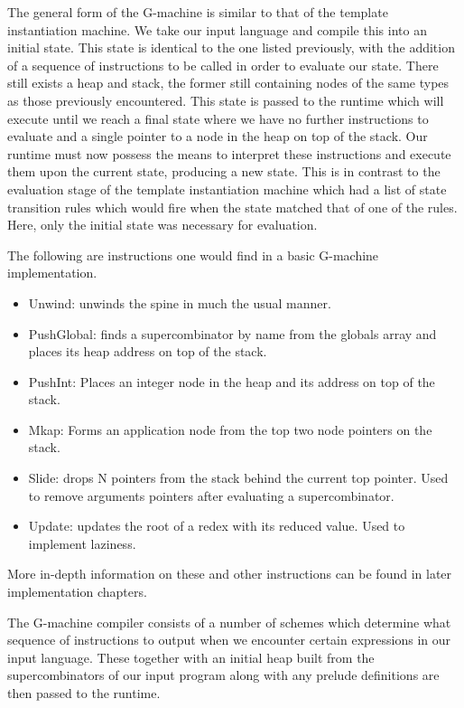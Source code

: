 \documentclass[11pt]{article}
\begin{document}
The general form of the G-machine is similar to that of
the template instantiation machine. We take our input language
and compile this into an initial state. This state is identical
to the one listed previously, with the addition of a sequence
of instructions to be called in order to evaluate our state.
There still exists a heap and stack, the former still containing
nodes of the same types as those previously encountered.
This state is passed to the runtime which will execute until
we reach a final state where we have no further instructions
to evaluate and a single pointer to a node in the heap on top
of the stack. Our runtime must now possess the means to 
interpret these instructions and execute them upon the current
state, producing a new state. This is in contrast to the 
evaluation stage of the template instantiation machine which
had a list of state transition rules which would fire when
the state matched that of one of the rules. Here, only the
initial state was necessary for evaluation.

The following are instructions one would find in a
basic G-machine implementation. 

\begin{itemize}
	\item Unwind: unwinds the spine in much the usual
		  manner.
	\item PushGlobal: finds a supercombinator by name 
		  from the globals array and places its heap
		  address on top of the stack.
	\item PushInt: Places an integer node in the heap
		  and its address on top of the stack.
	\item Mkap: Forms an application node from the
		  top two node pointers on the stack.
	\item Slide: drops N pointers from the stack behind
		  the current top pointer. Used to remove
		  arguments pointers after evaluating a 
		  supercombinator.
	\item Update: updates the root of a redex with its
		  reduced value. Used to implement laziness.
\end{itemize}

\noindent More in-depth information on these and other 
instructions can be found in later implementation chapters. 

The G-machine compiler consists of a number of schemes which
determine what sequence of instructions to output when we
encounter certain expressions in our input language. These
together with an initial heap built from the supercombinators
of our input program along with any prelude definitions are
then passed to the runtime.
\end{document}
